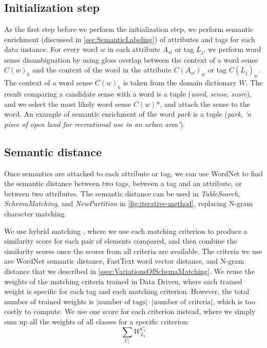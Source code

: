 \subsection{Initialization step}

As the first step before we perform the initialization step, we perform semantic enrichment (discussed in \autoref{sec:SemanticLabeling}) of attributes and tags for each data instance. For every word $w$ in each attribute $A_{si}$ or tag $L_j$, we perform word sense disambiguation by using gloss overlap between the context of a word sense $C(w)_k$ and the context of the word in the attribute $C(A_{si})_w$ or tag $C(L_j)_w$. The context of a word sense $C(w)_k$ is taken from the domain dictionary $W$. The result comparing a candidate sense with a word is a tuple (\textit{word}, \textit{sense}, \textit{score}), and we select the most likely word sense $C(w)$*, and attach the sense to the word. An example of semantic enrichment of the word \textit{park} is a tuple (\textit{park}, \textit{`a piece of open land for recreational use in an urban area'}).

\subsection{Semantic distance}

Once semantics are attached to each attribute or tag, we can use WordNet to find the semantic distance between two tags, between a tag and an attribute, or between two attributes. The semantic distance can be used in \textit{TableSearch}, \textit{SchemaMatching}, and \textit{NewPartition} in \autoref{fig:iterative-method}, replacing N-gram character matching.

We use hybrid matching \cite{Rahm2001Survey}, where we use each matching criterion to produce a similarity score for each pair of elements compared, and then combine the similarity scores once the scores from all criteria are available. The criteria we use are WordNet semantic distance, FastText word vector distance, and N-gram distance that we described in \autoref{ssec:VariationsOfSchemaMatching}. We reuse the weights of the matching criteria trained in Data Driven, where each trained weight is specific for each tag and each matching criterion. However, the total number of trained weights is $\left|\text{number of tags}\right|\cdot\left|\text{number of criteria}\right|$, which is too costly to compute. We use one score for each criterion instead, where we simply sum up all the weights of all classes for a specific criterion:
\[
\sum_{C_{i}}\ensuremath{W}_{L_{t}}^{C_{i}}
\]

